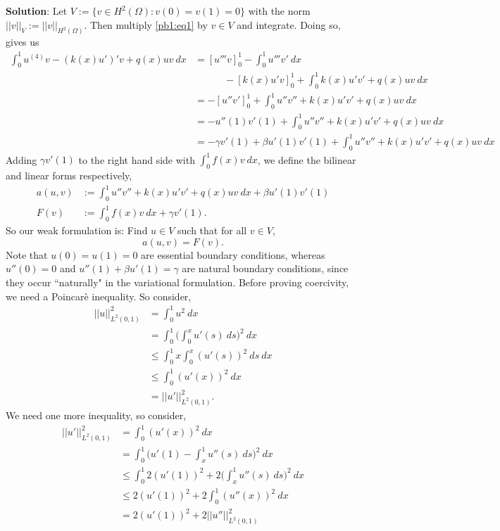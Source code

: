 \documentclass[11pt]{article}
\begin{document}
{\bf Solution}: Let $V := \{v \in H^2(\Omega) : v(0) = v(1) = 0\}$ with the norm $||v||_V := ||v||_{H^2(\Omega)}$.
Then multiply \eqref{pb1:eq1} by $v \in V$ and integrate. 
Doing so, gives us
\begin{align*}
    \int_0^1 u^{(4)}v - (k(x) u')' v + q(x) uv \: dx &= [u'''v]_0^1 - \int_0^1 u'''v' \: dx \\
    &\quad\quad\quad - [k(x)u'v]_0^1 +\int_0^1 k(x) u' v' + q(x) uv \: dx \\
    &= -[u''v']_0^1 + \int_0^1 u'' v'' + k(x) u'v' + q(x) uv \: dx \\
    &= -u''(1)v'(1) + \int_0^1 u'' v'' + k(x) u'v' + q(x) uv \: dx \\
    &= -\gamma v'(1) + \beta u'(1) v'(1)  + \int_0^1 u'' v'' + k(x) u'v' + q(x) uv \: dx 
\end{align*}
Adding $\gamma v'(1)$ to the right hand side with $\int_0^1 f(x) v \: dx$, we define the bilinear and linear forms respectively,
\begin{align}
    a(u,v) &:= \int_0^1 u'' v'' + k(x) u'v' + q(x) uv \: dx + \beta u'(1) v'(1) \\
    F(v) &:= \int_0^1 f(x) v \: dx + \gamma v'(1).
\end{align}
So our weak formulation is: Find $u \in V$ such that for all $v \in V$,
\begin{equation}
    a(u,v) = F(v).
\end{equation}
Note that $u(0) = u(1) = 0$ are essential boundary conditions, whereas $u''(0) = 0$ and $u''(1) + \beta u'(1) = \gamma$ are natural boundary conditions, since they occur ``naturally" in the variational formulation.
Before proving coercivity, we need a Poincar\`{e} inequality.
So consider,
\begin{align*}
    ||u||^2_{L^2(0,1)} &= \int_0^1 u^2 \: dx \\
    &= \int_0^1 \Big( \int_0^x u'(s) \: ds \Big)^2 \: dx \\
    &\leq \int_0^1 x \int_0^x (u'(s))^2 \: ds \: dx \\
    &\leq \int_0^1 (u'(x))^2 \: dx \\
    &= ||u'||^2_{L^2(0,1)}.
\end{align*}
We need one more inequality, so consider,
\begin{align*}
    ||u'||^2_{L^2(0,1)} &= \int_0^1 (u'(x))^2 \: dx \\
    &= \int_0^1 \Big( u'(1) - \int_x^1 u''(s) \: ds \Big)^2 \: dx \\
    &\leq \int_0^1 2(u'(1))^2 + 2\Big( \int_x^1 u''(s) \: ds \Big)^2 \: dx \\
    &\leq 2(u'(1))^2 + 2\int_0^1 (u''(x))^2 \: dx \\
    &= 2(u'(1))^2 + 2||u''||^2_{L^2(0,1)} 
\end{align*}
\end{document}
